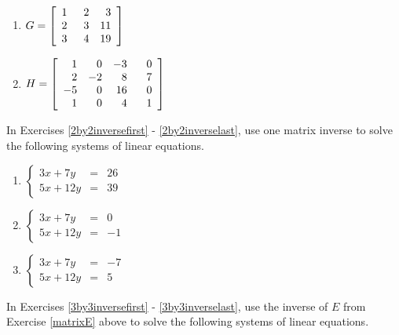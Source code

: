 \documentclass{ximera}
\begin{document}
\begin{multicols}{2}
\begin{enumerate}
\setcounter{enumi}{\value{HW}}

\item $G = \left[ \begin{array}{rrr} 1 & \hphantom{1}2 & 3 \\ 2 & 3 & 11 \\ 3 & 4 & 19 \end{array} \right]$
\item $H = \left[ \begin{array}{rrrr} 1 & 0 & -3 & \hphantom{-}0 \\ 2 & -2 & 8 & 7 \\ -5 & 0 & 16 & 0 \\ 1 & 0 & 4 & 1 \end{array} \right]$ \label{findmatinverselast}

\setcounter{HW}{\value{enumi}}
\end{enumerate}
\end{multicols}


In Exercises \ref{2by2inversefirst} - \ref{2by2inverselast}, use one matrix inverse to solve the following systems of linear equations.

\begin{multicols}{3}
\begin{enumerate}
\setcounter{enumi}{\value{HW}}

\item $\left\{ \begin{array}{rcr}   3x + 7y & = & 26 \\ 5x + 12y & = & 39  \end{array} \right.$ \label{2by2inversefirst}
\item $\left\{ \begin{array}{rcr}   3x + 7y & = &  0 \\ 5x + 12y & = & -1  \end{array} \right.$
\item $\left\{ \begin{array}{rcr}   3x + 7y & = & -7 \\ 5x + 12y & = &  5  \end{array} \right.$ \label{2by2inverselast}


\setcounter{HW}{\value{enumi}}
\end{enumerate}
\end{multicols}


In Exercises \ref{3by3inversefirst} - \ref{3by3inverselast}, use the inverse of $E$ from Exercise \ref{matrixE} above to solve the following systems of linear equations.
\end{document}
